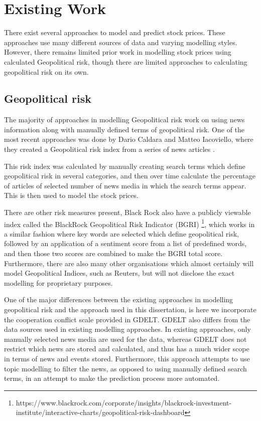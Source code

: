 \section{Existing Work}
\label{prior}
There exist several approaches to model and predict stock prices. These approaches use many different sources of data and varying modelling styles. However, there remains limited prior work in modelling stock prices using calculated Geopolitical risk, though there are limited approaches to calculating geopolitical risk on its own.

\subsection{Geopolitical risk}
The majority of approaches in modelling Geopolitical risk work on using news information along with manually defined terms of geopolitical risk. One of the most recent approaches was done by Dario Caldara and Matteo Iacoviello, where they created a Geopolitical risk index from a series of news articles \cite{caldara2018measuring}. 

This risk index was calculated by manually creating search terms which define geopolitical risk in several categories, and then over time calculate the percentage of articles of selected number of news media in which the search terms appear. This is then used to model the stock prices.

There are other risk measures present, Black Rock also have a publicly viewable index called the BlackRock Geopolitical Risk Indicator (BGRI) \footnote{https://www.blackrock.com/corporate/insights/blackrock-investment-institute/interactive-charts/geopolitical-risk-dashboard}, which works in a similar fashion where key words are selected which define geopolitical risk, followed by an application of a sentiment score from a list of predefined words, and then those two scores are combined to make the BGRI total score. Furthermore, there are also many other organisations which almost certainly will model Geopolitical Indices, such as Reuters, but will not disclose the exact modelling for proprietary purposes.

One of the major differences between the existing approaches in modelling geopolitical risk and the approach used in this dissertation, is here we incorporate the cooperation conflict scale provided in GDELT. GDELT also differs from the data sources used in existing modelling approaches. In existing approaches, only manually selected news media are used for the data, whereas GDELT does not restrict which news are stored and calculated, and thus has a much wider scope in terms of news and events stored. Furthermore, this approach attempts to use topic modelling to filter the news, as opposed to using manually defined search terms, in an attempt to make the prediction process more automated. 

